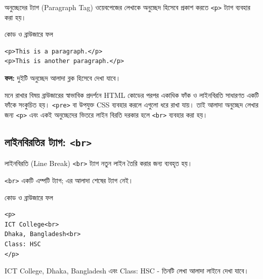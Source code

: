 \begin{definitionbox}{অনুচ্ছেদের ট্যাগ (Paragraph Tag)}
ওয়েবপেজের লেখাকে অনুচ্ছেদ হিসেবে প্রকাশ করতে \texttt{<p>} ট্যাগ ব্যবহার করা হয়।
\end{definitionbox}

\begin{chFourWholeExample}{কোড ও ব্রাউজারে ফল}
\noindent
\begin{minipage}[t]{.50\linewidth}\vspace{0pt}

\begin{verbatim}
<p>This is a paragraph.</p>
<p>This is another paragraph.</p>
\end{verbatim}

\end{minipage}\hfill
\begin{minipage}[t]{.46\linewidth}\vspace{0pt}
\textbf{ফল:} দুইটি অনুচ্ছেদ আলাদা ব্লক হিসেবে দেখা যাবে।\\
\end{minipage}
\end{chFourWholeExample}

\begin{keypointbox}{মনে রাখার বিষয়}
ব্রাউজারের স্বাভাবিক প্রদর্শনে HTML কোডের পরপর একাধিক ফাঁক ও লাইনবিরতি সাধারণত একটি ফাঁকে সংকুচিত হয়। \texttt{<pre>} বা উপযুক্ত CSS ব্যবহার করলে এগুলো ধরে রাখা যায়। তাই আলাদা অনুচ্ছেদ লেখার জন্য \texttt{<p>} এবং একই অনুচ্ছেদের ভিতরে লাইন বিরতি দরকার হলে \texttt{<br>} ব্যবহার করা হয়।
\end{keypointbox}

\subsection{লাইনবিরতির ট্যাগ: \texttt{<br>}}

\begin{definitionbox}{লাইনবিরতি (Line Break)}
\texttt{<br>} ট্যাগ নতুন লাইন তৈরি করার জন্য ব্যবহৃত হয়।
\end{definitionbox}

\texttt{<br>} একটি এম্পটি ট্যাগ; এর আলাদা শেষের ট্যাগ নেই।

\begin{chFourWholeExample}{কোড ও ব্রাউজারে ফল}
\noindent
\begin{minipage}[t]{.50\linewidth}\vspace{0pt}

\begin{verbatim}
<p>
ICT College<br>
Dhaka, Bangladesh<br>
Class: HSC
</p>
\end{verbatim}

\end{minipage}\hfill
\begin{minipage}[t]{.46\linewidth}\vspace{0pt}
ICT College, Dhaka, Bangladesh এবং Class: HSC - তিনটি লেখা আলাদা লাইনে দেখা যাবে।
\end{minipage}

\end{chFourWholeExample}

